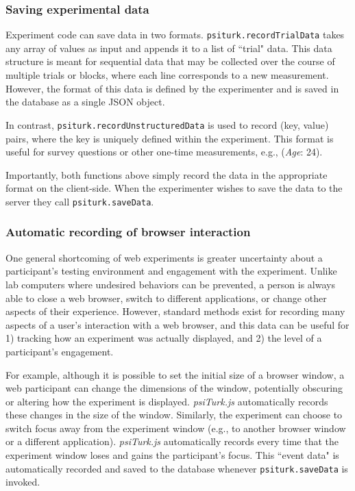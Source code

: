 \documentclass[twocolumn]{svjour3}          %
\begin{document}
\subsubsection{Saving experimental data} 

Experiment code can save data in two formats.
\texttt{psiturk.recordTrialData} takes any array of values as input and appends it to a list of ``trial" data.
This data structure is meant for sequential data that may be collected over the course of multiple trials or blocks, where each line corresponds to a new measurement.
However, the format of this data is defined by the experimenter and is saved in the database as a single JSON object.

In contrast, \texttt{psiturk.recordUnstructuredData} is used to record (key, value) pairs, where the key is uniquely defined within the experiment.
This format is useful for survey questions or other one-time measurements, e.g., (\emph{Age}: 24).

Importantly, both functions above simply record the data in the appropriate format on the client-side.
When the experimenter wishes to save the data to the server they call \texttt{psiturk.saveData}.

\subsubsection{Automatic recording of browser interaction}
 
One general shortcoming of web experiments is greater uncertainty about a participant's testing environment and engagement with the experiment.
Unlike lab computers where undesired behaviors can be prevented, a person is always able to close a web browser, switch to different applications, or change other aspects of their experience.
However, standard methods exist for recording many aspects of a user's interaction with a web browser, and this data can be useful for 1) tracking how an experiment was actually displayed, and 2) the level of a participant's engagement.

For example, although it is possible to set the initial size of a browser window, a web participant can change the dimensions of the window, potentially obscuring or altering how the experiment is displayed.
\emph{psiTurk.js} automatically records these changes in the size of the window.
Similarly, the experiment can choose to switch focus away from the experiment window (e.g., to another browser window or a different application).
\emph{psiTurk.js} automatically records every time that the experiment window loses and gains the participant's focus.
This ``event data" is automatically recorded and saved to the database whenever \texttt{psiturk.saveData} is invoked. \\
\end{document}

